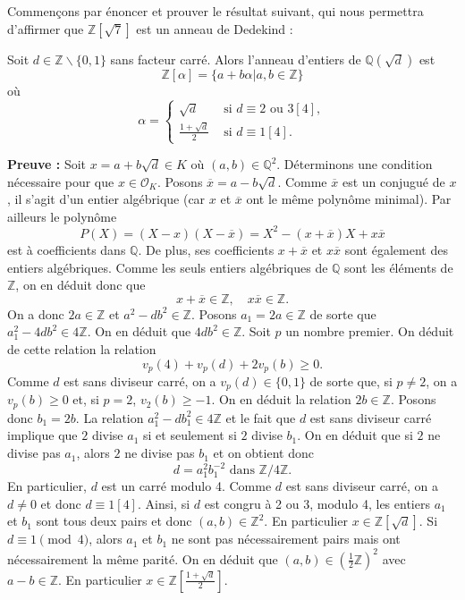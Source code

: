 \documentclass{article}
\newcommand{\bZ}{\mathbb{Z}}
\newcommand{\bQ}{\mathbb{Q}}
\begin{document}
Commençons par énoncer et prouver le résultat suivant, qui nous permettra d'affirmer que $\bZ[\sqrt{7}]$ est un anneau de Dedekind :

\begin{tcolorbox}[colback=red!5!white,colframe=red!75!black,title=Théorème : Anneau d'entiers d'un corps de nombres quadratique]
    Soit $d\in \bZ\backslash \{0,1\}$ sans facteur carré. Alors l'anneau d'entiers de $\bQ(\sqrt{d})$ est
    \[\bZ[\alpha] = \{a+b\alpha | a,b\in \bZ\}\]
    où
    \[\alpha = \begin{cases}
        \sqrt{d}& \text{ si } d\equiv 2\text{ ou }3[4],\\
        \frac{1+\sqrt{d}}{2} & \text{ si } d\equiv 1[4].
    \end{cases}\]
\end{tcolorbox}
    \textbf{Preuve :}  Soit \( x = a + b\sqrt{d} \in K \) où \( (a, b) \in \mathbb{Q}^2 \). Déterminons une condition nécessaire pour que \( x \in \mathcal{O}_K \). Posons \( \overline{x} = a - b\sqrt{d} \). Comme \( \overline{x} \) est un conjugué de \( x \), il s’agit d’un entier algébrique (car $x$ et $\overline{x}$ ont le même polynôme minimal). Par ailleurs le polynôme
\[ P(X) = (X - x)(X - \overline{x}) = X^2 - (x + \overline{x})X + x\overline{x} \]
est à coefficients dans \(\mathbb{Q}\). De plus, ses coefficients \( x + \overline{x} \) et \( x\overline{x} \) sont également des entiers algébriques. Comme les seuls entiers algébriques de \(\mathbb{Q}\) sont les éléments de \(\mathbb{Z}\), on en déduit donc que
\[ x + \overline{x} \in \mathbb{Z}, \quad x\overline{x} \in \mathbb{Z}. \]
On a donc \( 2a \in \mathbb{Z} \) et \( a^2 - db^2 \in \mathbb{Z} \). Posons \( a_1 = 2a \in \mathbb{Z} \) de sorte que \( a_1^2 - 4db^2 \in 4\mathbb{Z} \). On en déduit que \( 4db^2 \in \mathbb{Z} \). Soit \( p \) un nombre premier. On déduit de cette relation la relation
\[ v_p(4) + v_p(d) + 2v_p(b) \geq 0. \]
Comme \( d \) est sans diviseur carré, on a \( v_p(d) \in \{0, 1\} \) de sorte que, si \( p \ne 2 \), on a \( v_p(b) \geq 0 \) et, si \( p = 2 \), \( v_2(b) \geq -1 \). On en déduit la relation \( 2b \in \mathbb{Z} \). Posons donc \( b_1 = 2b \). La relation \( a_1^2 - db_1^2 \in 4\mathbb{Z} \) et le fait que \( d \) est sans diviseur carré implique que \( 2 \) divise \( a_1 \) si et seulement si \( 2 \) divise \( b_1 \). On en déduit que si \( 2 \) ne divise pas \( a_1 \), alors \( 2 \) ne divise pas \( b_1 \) et on obtient donc
\[ d = a_1^2b_1^{-2} \text{ dans } \mathbb{Z}/4\mathbb{Z}. \]
En particulier, \( d \) est un carré modulo 4. Comme \( d \) est sans diviseur carré, on a \( d \ne 0 \) et donc \( d \equiv 1 [4] \). Ainsi, si \( d \) est congru à 2 ou 3, modulo 4, les entiers \( a_1 \) et \( b_1 \) sont tous deux pairs et donc \( (a, b) \in \mathbb{Z}^2 \). En particulier \( x \in \mathbb{Z}[\sqrt{d}] \). Si \( d \equiv 1 \pmod{4} \), alors \( a_1 \) et \( b_1 \) ne sont pas nécessairement pairs mais ont nécessairement la même parité. On en déduit que \( (a, b) \in \left(\frac{1}{2}\mathbb{Z}\right)^2 \) avec \( a - b \in \mathbb{Z} \). En particulier \( x \in \mathbb{Z}\left[\frac{1 + \sqrt{d}}{2}\right] \).
\end{document}
